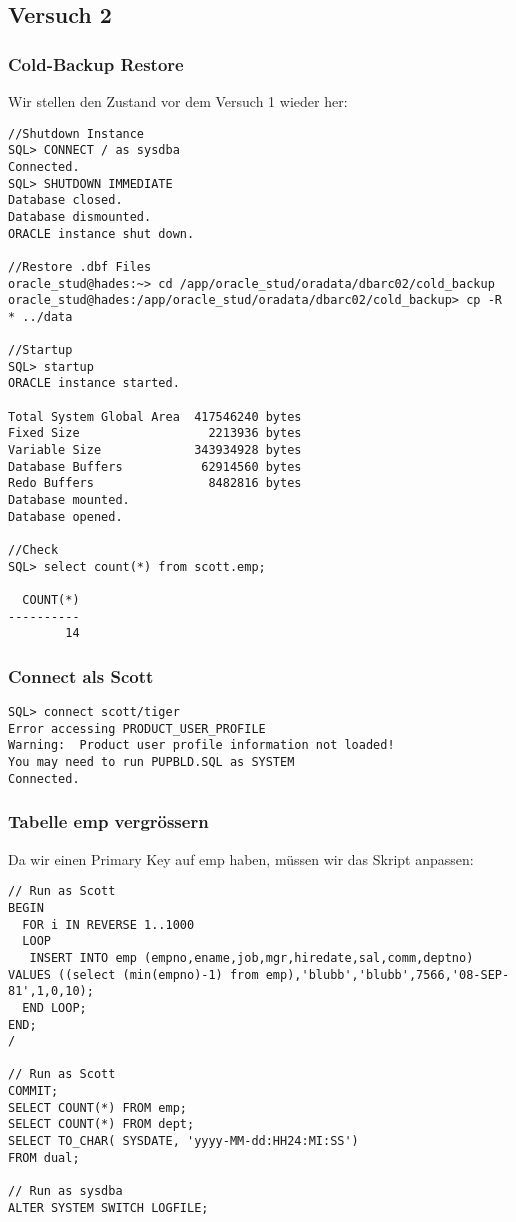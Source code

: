 \documentclass[11pt,a4paper,parskip=half]{scrartcl}
\begin{document}
\subsection{Versuch 2}
\subsubsection{Cold-Backup Restore}
Wir stellen den Zustand vor dem Versuch 1 wieder her:
\begin{lstlisting}
//Shutdown Instance
SQL> CONNECT / as sysdba
Connected.
SQL> SHUTDOWN IMMEDIATE
Database closed.
Database dismounted.
ORACLE instance shut down.

//Restore .dbf Files
oracle_stud@hades:~> cd /app/oracle_stud/oradata/dbarc02/cold_backup
oracle_stud@hades:/app/oracle_stud/oradata/dbarc02/cold_backup> cp -R * ../data

//Startup
SQL> startup
ORACLE instance started.

Total System Global Area  417546240 bytes
Fixed Size                  2213936 bytes
Variable Size             343934928 bytes
Database Buffers           62914560 bytes
Redo Buffers                8482816 bytes
Database mounted.
Database opened.

//Check
SQL> select count(*) from scott.emp;

  COUNT(*)
----------
        14
\end{lstlisting}

\subsubsection{Connect als Scott}
\begin{lstlisting}
SQL> connect scott/tiger
Error accessing PRODUCT_USER_PROFILE
Warning:  Product user profile information not loaded!
You may need to run PUPBLD.SQL as SYSTEM
Connected.
\end{lstlisting}

\subsubsection{Tabelle emp vergrössern}
Da wir einen Primary Key auf emp haben, müssen wir das Skript anpassen:
\begin{lstlisting}
// Run as Scott
BEGIN
  FOR i IN REVERSE 1..1000 
  LOOP
   INSERT INTO emp (empno,ename,job,mgr,hiredate,sal,comm,deptno) VALUES ((select (min(empno)-1) from emp),'blubb','blubb',7566,'08-SEP-81',1,0,10);
  END LOOP;
END;
/

// Run as Scott
COMMIT;
SELECT COUNT(*) FROM emp;
SELECT COUNT(*) FROM dept;
SELECT TO_CHAR( SYSDATE, 'yyyy-MM-dd:HH24:MI:SS')
FROM dual;

// Run as sysdba
ALTER SYSTEM SWITCH LOGFILE;
\end{lstlisting}
\end{document}
